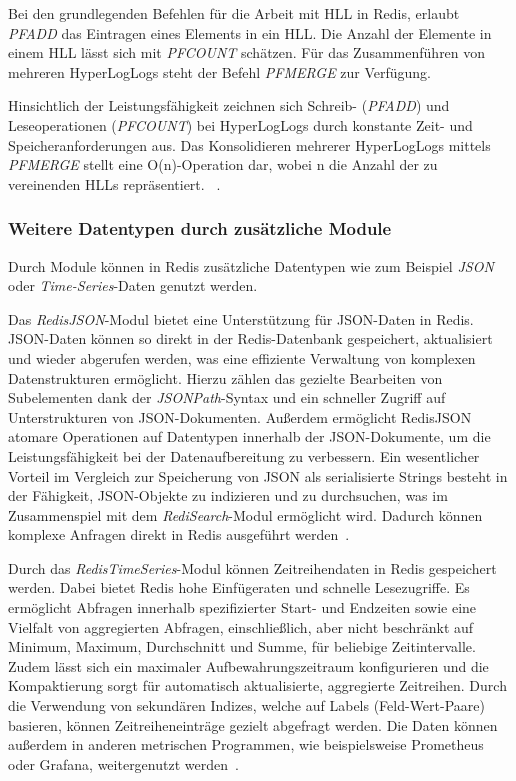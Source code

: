 Bei den grundlegenden Befehlen für die Arbeit mit \ac{HLL} in Redis, erlaubt \emph{PFADD} das Eintragen eines Elements in ein \ac{HLL}. Die Anzahl der Elemente in einem \ac{HLL} lässt sich mit \emph{PFCOUNT} schätzen. Für das Zusammenführen von mehreren HyperLogLogs steht der Befehl \emph{PFMERGE} zur Verfügung.

Hinsichtlich der Leistungsfähigkeit zeichnen sich Schreib- (\emph{PFADD}) und Leseoperationen (\emph{PFCOUNT}) bei HyperLogLogs durch konstante Zeit- und Speicheranforderungen aus. Das Konsolidieren mehrerer HyperLogLogs mittels \emph{PFMERGE} stellt eine O(n)-Operation dar, wobei n die Anzahl der zu vereinenden HLLs repräsentiert.
~\cite{redis_ltd_hyperloglog_nodate}.


\subsubsection{Weitere Datentypen durch zusätzliche Module}
Durch Module können in Redis zusätzliche Datentypen wie zum Beispiel \emph{JSON} oder \emph{Time-Series}-Daten genutzt werden.

Das \emph{RedisJSON}-Modul bietet eine Unterstützung für JSON-Daten in Redis.
JSON-Daten können so direkt in der Redis-Datenbank gespeichert, aktualisiert und wieder abgerufen werden, was eine effiziente Verwaltung von komplexen Datenstrukturen ermöglicht. Hierzu zählen das gezielte Bearbeiten von Subelementen dank der \emph{JSONPath}-Syntax und ein schneller Zugriff auf Unterstrukturen von JSON-Dokumenten.
Außerdem ermöglicht RedisJSON atomare Operationen auf Datentypen innerhalb der JSON-Dokumente, um die Leistungsfähigkeit bei der Datenaufbereitung zu verbessern.
Ein wesentlicher Vorteil im Vergleich zur Speicherung von JSON als serialisierte Strings besteht in der Fähigkeit, JSON-Objekte zu indizieren und zu durchsuchen, was im Zusammenspiel mit dem \emph{RediSearch}-Modul ermöglicht wird.
Dadurch können komplexe Anfragen direkt in Redis ausgeführt werden~\cite{redis_ltd_json_nodate, redis_ltd_json-use-cases_nodate}.

Durch das \emph{RedisTimeSeries}-Modul können Zeitreihendaten in Redis gespeichert werden.
Dabei bietet Redis hohe Einfügeraten und schnelle Lesezugriffe.
Es ermöglicht Abfragen innerhalb spezifizierter Start- und Endzeiten sowie eine Vielfalt von aggregierten Abfragen, einschließlich, aber nicht beschränkt auf Minimum, Maximum, Durchschnitt und Summe, für beliebige Zeitintervalle.
Zudem lässt sich ein maximaler Aufbewahrungszeitraum konfigurieren und die Kompaktierung sorgt für automatisch aktualisierte, aggregierte Zeitreihen.
Durch die Verwendung von sekundären Indizes, welche auf Labels (Feld-Wert-Paare) basieren, können Zeitreiheneinträge gezielt abgefragt werden.
Die Daten können außerdem in anderen metrischen Programmen, wie beispielsweise Prometheus oder Grafana, weitergenutzt werden~\cite{redis_ltd_time_nodate}.



